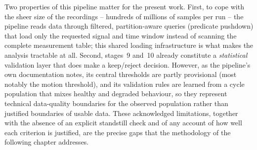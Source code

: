 Two properties of this pipeline matter for the present work. First, to cope with the sheer
size of the recordings -- hundreds of millions of samples per run -- the pipeline reads
data through filtered, partition-aware queries (predicate pushdown) that load only the
requested signal and time window instead of scanning the complete measurement table; this
shared loading infrastructure is what makes the analysis tractable at all. Second, stages~9
and~10 already constitute a \emph{statistical} validation layer that does make a keep/reject
decision. However, as the pipeline's own documentation notes, its central thresholds are
partly provisional (most notably the motion threshold), and its validation rules are
learned from a cycle population that mixes healthy and degraded behaviour, so they
represent technical data-quality boundaries for the observed population rather than
justified boundaries of usable data. These acknowledged limitations, together with the
absence of an explicit standstill check and of any account of how well each criterion is
justified, are the precise gaps that the methodology of the following chapter addresses.
